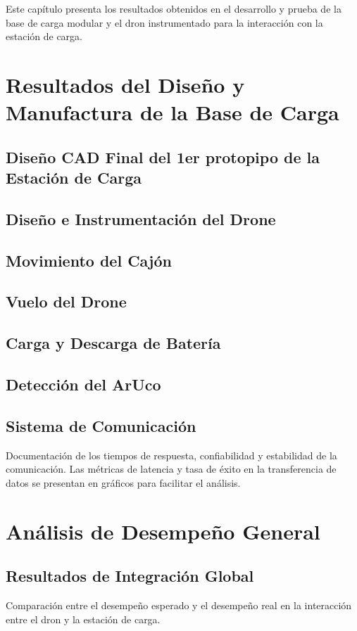 Este capítulo presenta los resultados obtenidos en el desarrollo y prueba de la base de carga modular y el dron instrumentado para la interacción con la estación de carga. 

\section{Resultados del Diseño y Manufactura de la Base de Carga}
\subsection{Diseño CAD Final del 1er protopipo de la Estación de Carga}

\subsection{Diseño e Instrumentación del Drone}

\subsection{Movimiento del Cajón}

\subsection{Vuelo del Drone}

\subsection{Carga y Descarga de Batería}

\subsection{Detección del ArUco}

\subsection{Sistema de Comunicación}
Documentación de los tiempos de respuesta, confiabilidad y estabilidad de la comunicación. Las métricas de latencia y tasa de éxito en la transferencia de datos se presentan en gráficos para facilitar el análisis.

\section{Análisis de Desempeño General}
\subsection{Resultados de Integración Global}
Comparación entre el desempeño esperado y el desempeño real en la interacción entre el dron y la estación de carga.

